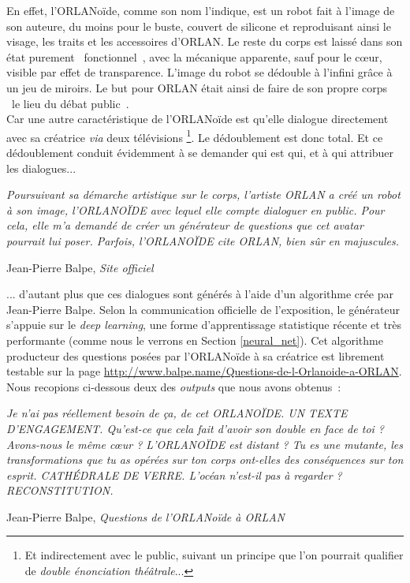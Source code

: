 \documentclass{article}
\newenvironment{citationbox}
{\begin{center}
		\begin{minipage}{.8\textwidth}
		}
		{
		\end{minipage}	
\end{center}
}
\begin{document}
				En effet, l'ORLANoïde, comme son nom l'indique, est un robot fait à l'image de son auteure, du moins pour le buste, couvert de silicone et reproduisant ainsi le visage, les traits et les accessoires d'ORLAN. Le reste du corps est laissé dans son état purement \guillemotleft~fonctionnel~\guillemotright, avec la mécanique apparente, sauf pour le cœur, visible par effet de transparence. L'image du robot se dédouble à l'infini grâce à un jeu de miroirs. Le but pour ORLAN était ainsi de faire de son propre corps \guillemotleft~le lieu du débat public~\guillemotright.\\
				Car une autre caractéristique de l'ORLANoïde est qu'elle dialogue directement avec sa créatrice \textit{via} deux télévisions \footnote{Et indirectement avec le public, suivant un principe que l'on pourrait qualifier de \textit{double énonciation théâtrale}...}. Le dédoublement est donc total. Et ce dédoublement conduit évidemment à se demander qui est qui, et à qui attribuer les dialogues...
				\begin{citationbox}
					\textit{Poursuivant sa démarche artistique sur le corps, l’artiste ORLAN a créé un robot à son image, l’ORLANOÏDE avec lequel elle compte dialoguer en public. Pour cela, elle m’a demandé de créer un générateur de questions que cet avatar pourrait lui poser. Parfois, l’ORLANOÏDE cite ORLAN, bien sûr en majuscules.}\begin{flushright}
						Jean-Pierre Balpe, \textit{Site officiel} \autocite{balpe_site}
					\end{flushright}
				\end{citationbox}
				... d'autant plus que ces dialogues sont générés à l'aide d'un algorithme crée par Jean-Pierre Balpe. Selon la communication officielle de l'exposition, le générateur s'appuie sur le \textit{deep learning}, une forme d'apprentissage statistique récente et très performante (comme nous le verrons en Section \ref{neural_net}). Cet algorithme producteur des questions posées par l'ORLANoïde à sa créatrice est librement testable sur la page \href{http://www.balpe.name/Questions-de-l-Orlanoide-a-ORLAN}{http://www.balpe.name/Questions-de-l-Orlanoide-a-ORLAN}. Nous recopions ci-dessous deux des \textit{outputs} que nous avons obtenus~:
				\begin{citationbox}
					\textit{Je n'ai pas réellement besoin de ça, de cet ORLANOÏDE. UN TEXTE D’ENGAGEMENT. Qu'est-ce que cela fait d’avoir son double en face de toi ? Avons-nous le même cœur ? L'ORLANOÏDE est distant ? Tu es une mutante, les transformations que tu as opérées sur ton corps ont-elles des conséquences sur ton esprit. CATHÉDRALE DE VERRE. L'océan n'est-il pas à regarder ? RECONSTITUTION.}
					\begin{flushright}
						Jean-Pierre Balpe, \textit{Questions de l'ORLANoïde à ORLAN} \autocite{balpe_site}
					\end{flushright}
				\end{citationbox}
\end{document}
